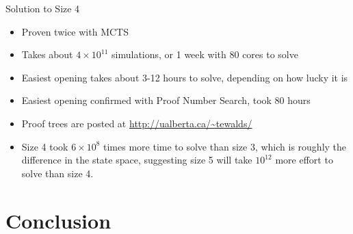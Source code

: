 \documentclass{beamer} %
\begin{document}
\begin{frame}{Solution to Size 4}
\begin{itemize}
\item Proven twice with MCTS
\item Takes about $4 \times 10^{11}$ simulations, or 1 week with 80 cores to solve
\item Easiest opening takes about 3-12 hours to solve, depending on how lucky it is
\item Easiest opening confirmed with Proof Number Search, took 80 hours
\item Proof trees are posted at \url{http://ualberta.ca/~tewalds/}
\item Size 4 took $6 \times 10^8$ times more time to solve than size 3, which is roughly the difference in the state space, suggesting size 5 will take $10^{12}$ more effort to solve than size 4.
\end{itemize}
\end{frame}

%


\section{Conclusion}

\end{document}
